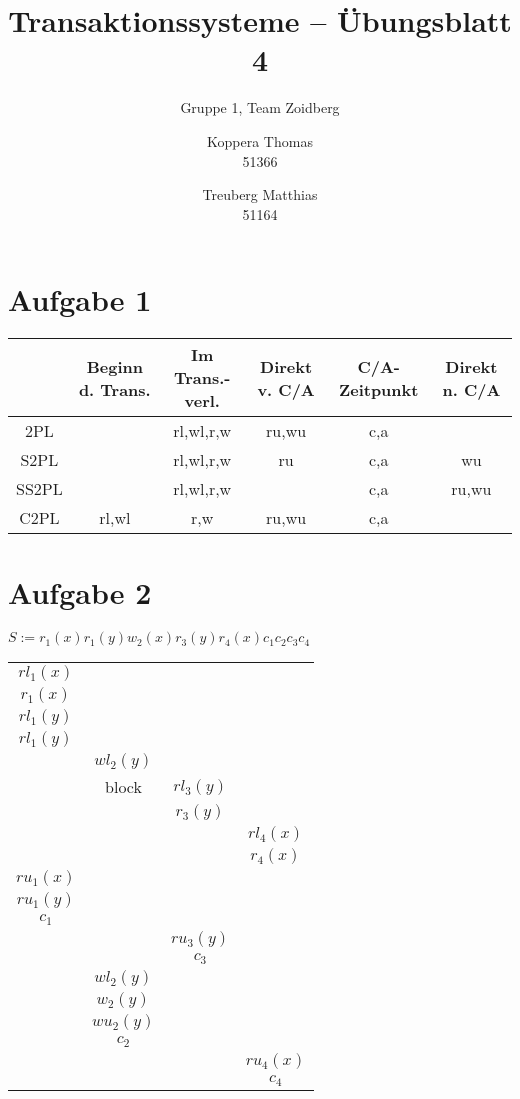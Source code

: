 \documentclass{scrartcl}
\title{Transaktionssysteme -- Übungsblatt 4}
\subtitle{Gruppe 1, Team Zoidberg}
\author{Koppera Thomas \\ 51366
 \and Treuberg Matthias \\ 51164}
\date{ }
\begin{document}
  \maketitle
  
\section*{Aufgabe 1}

\begin{tabular}[ht]{|c|c|c|c|c|c|}
\hline  & Beginn d. Trans. & Im Trans.-verl. & Direkt v. C/A & C/A-Zeitpunkt & Direkt n. C/A \\ 
\hline 2PL & & rl,wl,r,w & ru,wu & c,a &  \\ 
\hline S2PL &  & rl,wl,r,w & ru & c,a & wu \\ 
\hline SS2PL &  & rl,wl,r,w & & c,a & ru,wu \\ 
\hline C2PL & rl,wl & r,w & ru,wu & c,a &  \\ 
\hline 
\end{tabular} 


\section*{Aufgabe 2}
$S := r_1(x)r_1(y)w_2(x)r_3(y)r_4(x)c_1c_2c_3c_4$\\
\begin{tabular}{|c|c|c|c|}
\hline
 $rl_1(x)$ &  &  &  \\ 
 $r_1(x)$ &  &  &  \\ 
 $rl_1(y)$ &  &  &  \\ 
 $rl_1(y)$ &  &  &  \\ 
  & $wl_2(y)$ &  &  \\ 
  & block & $rl_3(y)$ &  \\ 
  &  & $r_3(y)$ &  \\ 
  &  &  & $rl_4(x)$ \\ 
  &  &  & $r_4(x)$ \\ 
 $ru_1(x)$ &  &  &  \\ 
 $ru_1(y)$ &  &  &  \\ 
 $c_1$ &  &  &  \\ 
  &  & $ru_3(y)$ &  \\ 
  &  & $c_3$ &  \\ 
  & $wl_2(y)$ &  &  \\ 
  & $w_2(y)$ &  &  \\ 
  & $wu_2(y)$ &  &  \\ 
  & $c_2$ &  &  \\ 
  &  &  & $ru_4(x)$ \\ 
  &  &  & $c_4$ \\ 
\hline
\end{tabular}
\end{document}
